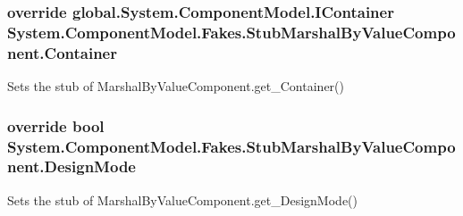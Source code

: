 \hypertarget{class_system_1_1_component_model_1_1_fakes_1_1_stub_marshal_by_value_component_afa57590494a52c366ddbd8e0c34785e2}{
\subsubsection[{Container}]{\setlength{\rightskip}{0pt plus 5cm}override global.\-System.\-Component\-Model.\-I\-Container System.\-Component\-Model.\-Fakes.\-Stub\-Marshal\-By\-Value\-Component.\-Container\hspace{0.3cm}{\ttfamily [get]}}}\label{class_system_1_1_component_model_1_1_fakes_1_1_stub_marshal_by_value_component_afa57590494a52c366ddbd8e0c34785e2}


Sets the stub of Marshal\-By\-Value\-Component.\-get\-\_\-\-Container()

\hypertarget{class_system_1_1_component_model_1_1_fakes_1_1_stub_marshal_by_value_component_a9620e20f59caf6627655a348611a84b5}{
\subsubsection[{Design\-Mode}]{\setlength{\rightskip}{0pt plus 5cm}override bool System.\-Component\-Model.\-Fakes.\-Stub\-Marshal\-By\-Value\-Component.\-Design\-Mode\hspace{0.3cm}{\ttfamily [get]}}}\label{class_system_1_1_component_model_1_1_fakes_1_1_stub_marshal_by_value_component_a9620e20f59caf6627655a348611a84b5}


Sets the stub of Marshal\-By\-Value\-Component.\-get\-\_\-\-Design\-Mode()

